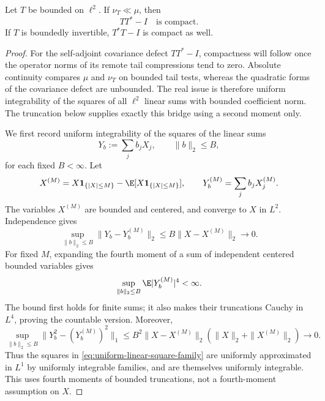\begin{lemma}
\label{lem:compact-covariance-rigidity}
Let $T$ be bounded on $\ell^2$.  If $\nu_T\ll\mu$, then
\[
 TT^*-I\quad\text{is compact}.
\]
If $T$ is boundedly invertible, $T^*T-I$ is compact as well.
\end{lemma}
\begin{proof}
For the self-adjoint covariance defect \(TT^*-I\), compactness will follow once
the operator norms of its remote tail compressions tend to zero.  Absolute
continuity compares \(\mu\) and \(\nu_T\) on bounded tail tests, whereas the
quadratic forms of the covariance defect are unbounded.  The real issue is
therefore uniform integrability of the squares of all \(\ell^2\) linear sums
with bounded coefficient norm.  The truncation below supplies exactly this
bridge using a second moment only.

We first record uniform integrability of the squares of the linear sums
\begin{equation}
 Y_b:=\sum_jb_jX_j,\qquad \|b\|_2\leq B,
 \label{eq:uniform-linear-square-family}
\end{equation}
for each fixed $B<\infty$.  Let
\[
 X^{(M)}=X\mathbf1_{\{|X|\leq M\}}
           -\E[X\mathbf1_{\{|X|\leq M\}}],
 \qquad Y_b^{(M)}=\sum_jb_jX_j^{(M)}.
\]
The variables $X^{(M)}$ are bounded and centered, and converge to $X$
in $L^2$.  Independence gives
\[
 \sup_{\|b\|_2\leq B}\|Y_b-Y_b^{(M)}\|_2
 \leq B\|X-X^{(M)}\|_2\longrightarrow0.
\]
For fixed $M$, expanding the fourth moment of a sum of independent
centered bounded variables gives
\[
 \sup_{\|b\|_2\leq B}\E|Y_b^{(M)}|^4<\infty.
\]
The bound first holds for finite sums; it also makes their truncations
Cauchy in $L^4$, proving the countable version.  Moreover,
\[
 \sup_{\|b\|_2\leq B}
 \bigl\|Y_b^2-(Y_b^{(M)})^2\bigr\|_1
 \leq B^2\|X-X^{(M)}\|_2
                  (\|X\|_2+\|X^{(M)}\|_2)
 \longrightarrow0.
\]
Thus the squares in \eqref{eq:uniform-linear-square-family}
are uniformly approximated in $L^1$ by uniformly integrable families,
and are themselves uniformly integrable.  This uses fourth moments of
bounded truncations, not a fourth-moment assumption on $X$.


\end{proof}
